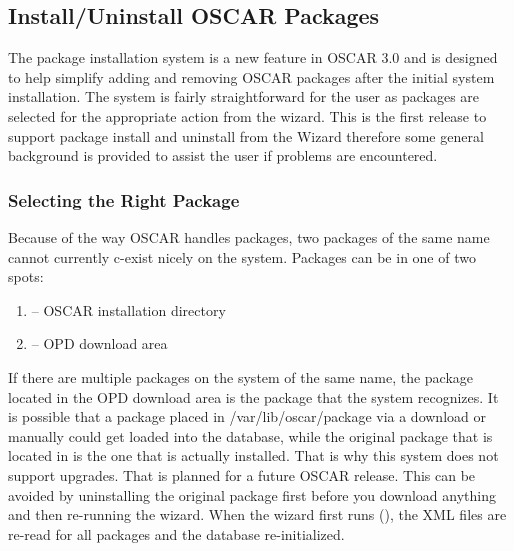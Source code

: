 
\subsection{Install/Uninstall OSCAR Packages}
\label{det:install-uninstall-packages}

The package installation system is a new feature in OSCAR 3.0 and is
designed to help simplify adding and removing OSCAR packages after
the initial system installation.  The system is fairly
straightforward for the user as packages are selected for the
appropriate action from the wizard. This is the first release to
support package install and uninstall from the Wizard therefore some
general background is provided to assist the user if problems are
encountered.

\subsubsection{Selecting the Right Package}
\label{det:select-package}

Because of the way OSCAR handles packages, two packages of the same name
cannot currently c-exist nicely on the system.  Packages can be in one of
two spots:

\begin{enumerate}

\item {} -- OSCAR installation directory
\item {} -- OPD download area

\end{enumerate}

If there are multiple packages on the system of the same name, the package
located in the OPD download area is the package that the system recognizes.
It is possible that a package placed in /var/lib/oscar/package via a download
or manually could get loaded into the database, while the original package
that is located in  is the one that is actually
installed.  That is why this system does not support upgrades.  That is
planned for a future OSCAR release.  This can be avoided by uninstalling the
original package first before you download anything and then re-running the
wizard.  When the wizard first runs (), the
XML files are re-read for all packages and the database re-initialized.

